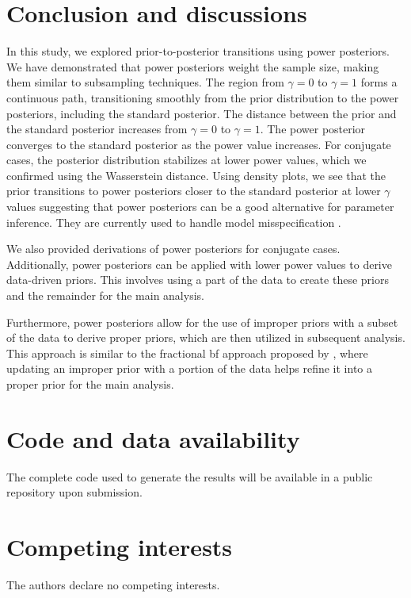 \documentclass[12pt]{article}
\begin{document}
\section{Conclusion and discussions}
In this study, we explored prior-to-posterior transitions using power posteriors. We have demonstrated that power posteriors weight the sample size, making them similar to subsampling techniques.  The region from $\gamma =0$ to $\gamma =1$ forms a continuous path, transitioning smoothly from the prior distribution to the power posteriors, including the standard posterior. The distance between the prior and the standard posterior increases from $\gamma =0$ to $\gamma =1$. 
The power posterior converges to the standard posterior as the power value increases. For conjugate cases, the posterior distribution stabilizes at lower power values, which we confirmed using the Wasserstein distance. Using density plots, we see that the prior transitions to power posteriors closer to the standard posterior at lower $\gamma$ values suggesting that power posteriors can be a good alternative for parameter inference. They are currently used to handle model misspecification \citep{Jeffrey_2019}.

We also provided derivations of power posteriors for conjugate cases.  Additionally, power posteriors can be applied with lower power values to derive data-driven priors. This involves using a part of the data to create these priors and the remainder for the main analysis.

Furthermore, power posteriors allow for the use of improper priors with a subset of the data to derive proper priors, which are then utilized in subsequent analysis. This approach is similar to the fractional \gls{bf} approach proposed by \cite{ohaganPropertiesIntrinsicFractional1997}, where updating an improper prior with a portion of the data helps refine it into a proper prior for the main analysis.


\section*{Code and data availability}
The complete code used to generate the results will be available in a public repository upon submission.

\section*{Competing interests}
The authors declare no competing interests. 
\end{document}
